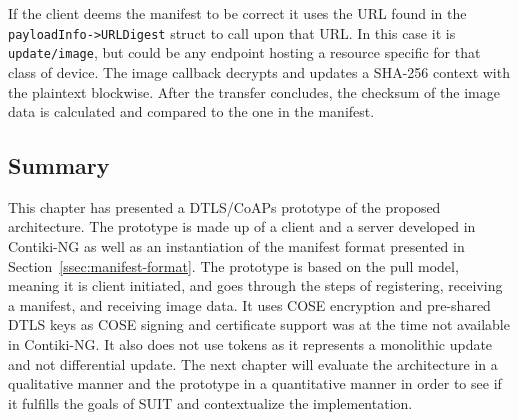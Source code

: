 \documentclass[0-thesis.tex]{subfiles}
\begin{document}
If the client deems the manifest to be correct it uses the URL found in the
\texttt{payloadInfo->URLDigest} struct to call upon that URL. In this case it is
\texttt{update/image}, but could be any endpoint hosting a resource specific for that
class of device. The image callback decrypts and updates a SHA-256 context with the
plaintext blockwise. After the transfer concludes, the checksum of the image data is
calculated and compared to the one in the manifest.


\subsection{Summary}
\label{ssec:implementation-summary}
This chapter has presented a DTLS/CoAPs prototype of the proposed architecture. The
prototype is made up of a client and a server developed in Contiki-NG as well as an
instantiation of the manifest format presented in Section~\ref{ssec:manifest-format}. The
prototype is based on the pull model, meaning it is client initiated, and goes through the
steps of registering, receiving a manifest, and receiving image data. It uses COSE
encryption and pre-shared DTLS keys as COSE signing and certificate support was at the
time not available in Contiki-NG. It also does not use tokens as it represents a
monolithic update and not differential update. The next chapter will evaluate the
architecture in a qualitative manner and the prototype in a quantitative manner in order
to see if it fulfills the goals of SUIT and contextualize the implementation.
\end{document}
